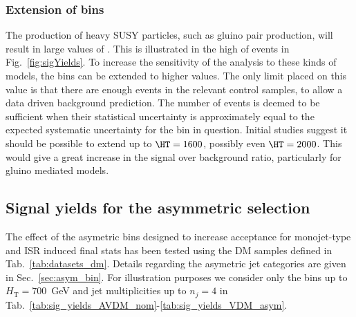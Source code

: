 \subsubsection{Extension of \HT bins}

The production of heavy SUSY particles, such as gluino pair
production, will result in large values of \HT . This is illustrated in the high 
\HT of events in Fig.~\ref{fig:sigYields}. To increase the sensitivity
of the analysis to these kinds of models, the \HT bins can be extended to higher
values. The only limit placed on this value is that there are enough events in the
relevant control samples, to allow a data driven background prediction. The
number of events is deemed to be sufficient when their statistical uncertainty is
approximately equal to the expected systematic uncertainty for the bin in
question. Initial studies suggest it should be possible to extend up to
$\HT=1600$, possibly even $\HT=2000$. This would give a great increase in the
signal over background ratio, particularly for gluino mediated models.

\clearpage
\subsection{Signal yields for the asymmetric selection}
The effect of the asymetric bins designed to increase acceptance for monojet-type and ISR induced final stats has been tested using the DM samples defined in Tab.~\ref{tab:datasets_dm}. Details regarding the asymetric jet categories are given in Sec.~\ref{sec:asym_bin}.
For illustration purposes we consider only the bins up to $H_\textrm{T}=700$~GeV and jet multiplicities up to $n_j=4$ in Tab.~\ref{tab:sig_yields_AVDM_nom}-\ref{tab:sig_yields_VDM_asym}.

